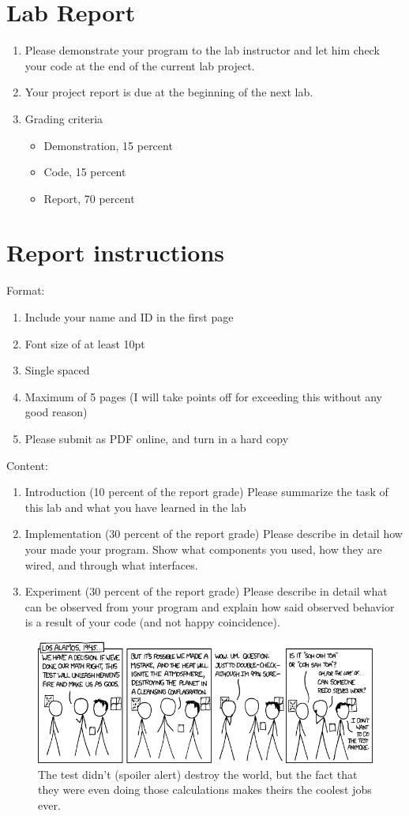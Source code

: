 \documentclass[letterpaper,12pt]{article}
\begin{document}
\section*{Lab Report}
\begin{enumerate}
   \item Please demonstrate your program to the lab instructor and let him check your code at the end of the current lab project.
   \item Your project report is due at the beginning of the next lab.
   \item Grading criteria
      \begin{itemize}
         \item Demonstration, 15 percent
         \item Code, 15 percent
         \item Report, 70 percent
      \end{itemize}
\end{enumerate}
\section*{Report instructions}
Format:
\begin{enumerate}
   \item Include your name and ID in the first page
   \item Font size of at least 10pt
   \item Single spaced
   \item Maximum of 5 pages (I will take points off for exceeding this without any good reason)
   \item Please submit as PDF online, and turn in a hard copy
\end{enumerate}
Content:
\begin{enumerate}
   \item Introduction (10 percent of the report grade) Please summarize the task of this lab and what you have learned in the lab
   \item Implementation (30 percent of the report grade) Please describe in detail how your made your program. Show what components you used, how they are wired, and through what interfaces.
   \item Experiment (30 percent of the report grade) Please describe in detail what can be observed from your program and explain how said observed behavior is a result of your code (and not happy coincidence).
\end{enumerate}

\begin{figure}[ht!]
	\centering
	\includegraphics[width=5in]{los_alamos.png}
   \caption*{The test didn't (spoiler alert) destroy the world, but the fact that they were even doing those calculations makes theirs the coolest jobs ever.}
\end{figure}
\end{document}
